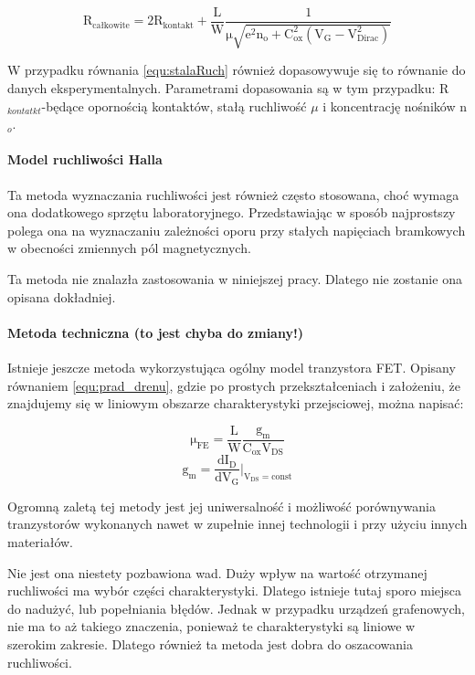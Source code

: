 \begin{equation}
    \mathrm{ R_{całkowite} = 2R_{kontakt}+ \frac{L}{W}\frac{1}{\mu \sqrt{e^2 n_o + C_{ox}^2(V_G-V_{Dirac}^2)}}}
	\label{equ:stalaRuch}
\end{equation}

W przypadku równania \ref{equ:stalaRuch} również dopasowywuje się to równanie do danych eksperymentalnych. Parametrami
dopasowania są w tym przypadku: R$_{kontatkt}$-będące opornością kontaktów, stałą ruchliwość $\mu$  i koncentrację nośników
n$_o$.

\paragraph{Model ruchliwości Halla}
Ta metoda wyznaczania ruchliwości jest również często stosowana, choć wymaga ona dodatkowego sprzętu laboratoryjnego. 
Przedstawiając w sposób najprostszy polega ona na wyznaczaniu zależności oporu przy stałych napięciach bramkowych
w obecności zmiennych pól magnetycznych. 

Ta metoda nie znalazła zastosowania w niniejszej pracy. Dlatego nie zostanie ona opisana dokładniej.

\paragraph{Metoda techniczna (to jest chyba do zmiany!)}
Istnieje jeszcze metoda wykorzystująca ogólny model tranzystora FET. Opisany równaniem \ref{equ:prad_drenu}, gdzie po 
prostych przekształceniach i założeniu, że znajdujemy się w liniowym obszarze charakterystyki przejsciowej, można napisać:

\begin{equation}
    \mathrm{ \mu_{FE} = \frac{L}{W}\frac{g_m}{C_{ox}V_{DS}}}
\end{equation}
\begin{equation}
    \mathrm{ g_m = \frac{d I_D}{d V_G} |_{ V_{DS}=const}}
\end{equation}

Ogromną zaletą tej metody jest jej uniwersalność i możliwość porównywania tranzystorów wykonanych nawet w zupełnie innej
technologii i przy użyciu innych materiałów. 

Nie jest ona niestety pozbawiona wad. Duży wpływ na wartość otrzymanej ruchliwości ma wybór części charakterystyki. 
Dlatego istnieje tutaj sporo miejsca do nadużyć, lub popełniania błędów. Jednak w przypadku urządzeń grafenowych, nie ma
to aż takiego znaczenia, ponieważ te charakterystyki są liniowe w szerokim zakresie. Dlatego również ta metoda jest dobra
do oszacowania ruchliwości.


